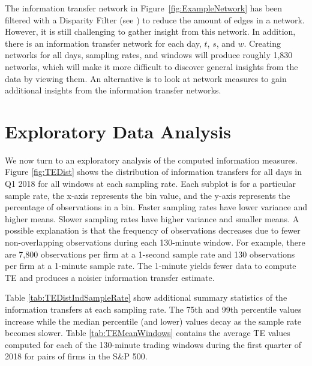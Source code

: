 The information transfer network in Figure~\ref{fig:ExampleNetwork} has been filtered with a Disparity Filter (see \cite{Serrano}) to reduce the amount of edges in a network.  However, it is still challenging to gather insight from this network.  In addition, there is an information transfer network for each day, $t$,  $s$,  and $w$. Creating networks for all days,  sampling rates, and windows will produce roughly 1,830 networks, which will make it more difficult to discover general insights from the data by viewing them.  An alternative is to look at network measures to gain additional insights from the information transfer networks.


\section{Exploratory Data Analysis}

We now turn to an exploratory analysis of the computed information measures. Figure \ref{fig:TEDist} shows the distribution of information transfers for all days in Q1 2018 for all windows at each sampling rate.   Each subplot is for a particular sample rate,  the x-axis represents the bin value,  and the y-axis represents the percentage of observations in a bin.  Faster sampling rates have lower variance and higher means.  Slower sampling rates have higher variance and smaller means.  A possible explanation is that the frequency of observations decreases due to fewer non-overlapping observations during each 130-minute window.   For example,  there are 7,800 observations per firm at a 1-second sample rate and 130 observations per firm at a 1-minute sample rate. The 1-minute yields fewer data to compute TE and produces a noisier information transfer estimate. 

Table \ref{tab:TEDistIndSampleRate} show additional summary statistics of the information transfers at  each sampling rate.  The 75th and 99th percentile values increase while the median percentile (and lower) values decay as the sample rate becomes slower.  Table \ref{tab:TEMeanWindows} contains the average TE values computed for each of the 130-minute trading windows during the first quarter of 2018 for pairs of firms in the S\&P 500.  

